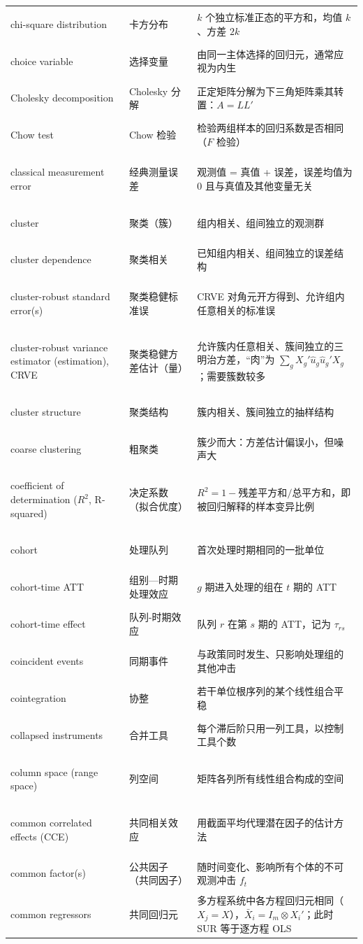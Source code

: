 \begin{longtable}{@{}>{\bfseries\boldmath\raggedright\arraybackslash}p{4.6cm}>{\raggedright\arraybackslash}p{3.2cm}>{\raggedright\arraybackslash}p{\dimexpr\textwidth-7.8cm-4\tabcolsep\relax}@{}}
chi-square distribution & 卡方分布 & $k$ 个独立标准正态的平方和，均值 $k$、方差 $2k$ \\
choice variable & 选择变量 & 由同一主体选择的回归元，通常应视为内生 \\
Cholesky decomposition & Cholesky 分解 & 正定矩阵分解为下三角矩阵乘其转置：$A=LL'$ \\
Chow test & Chow 检验 & 检验两组样本的回归系数是否相同（$F$ 检验） \\
classical measurement error & 经典测量误差 & 观测值 = 真值 + 误差，误差均值为 0 且与真值及其他变量无关 \\
cluster & 聚类（簇） & 组内相关、组间独立的观测群 \\
cluster dependence & 聚类相关 & 已知组内相关、组间独立的误差结构 \\
cluster-robust standard error(s) & 聚类稳健标准误 & CRVE 对角元开方得到、允许组内任意相关的标准误 \\
cluster-robust variance estimator (estimation), CRVE & 聚类稳健方差估计（量） & 允许簇内任意相关、簇间独立的三明治方差，“肉”为 $\sum_gX_g'\hat u_g\hat u_g'X_g$；需要簇数较多 \\
cluster structure & 聚类结构 & 簇内相关、簇间独立的抽样结构 \\
coarse clustering & 粗聚类 & 簇少而大：方差估计偏误小，但噪声大 \\
coefficient of determination ($R^2$, R-squared) & 决定系数（拟合优度） & $R^2=1-{}$残差平方和$/$总平方和，即被回归解释的样本变异比例 \\
cohort & 处理队列 & 首次处理时期相同的一批单位 \\
cohort-time ATT & 组别—时期处理效应 & $g$ 期进入处理的组在 $t$ 期的 ATT \\
cohort-time effect & 队列-时期效应 & 队列 $r$ 在第 $s$ 期的 ATT，记为 $\tau_{rs}$ \\
coincident events & 同期事件 & 与政策同时发生、只影响处理组的其他冲击 \\
cointegration & 协整 & 若干单位根序列的某个线性组合平稳 \\
collapsed instruments & 合并工具 & 每个滞后阶只用一列工具，以控制工具个数 \\
column space (range space) & 列空间 & 矩阵各列所有线性组合构成的空间 \\
common correlated effects (CCE) & 共同相关效应 & 用截面平均代理潜在因子的估计方法 \\
common factor(s) & 公共因子（共同因子） & 随时间变化、影响所有个体的不可观测冲击 $f_t$ \\
common regressors & 共同回归元 & 多方程系统中各方程回归元相同（$X_j=X$），$\bar X_i=I_m\otimes X_i'$；此时 SUR 等于逐方程 OLS \\

\end{longtable}
